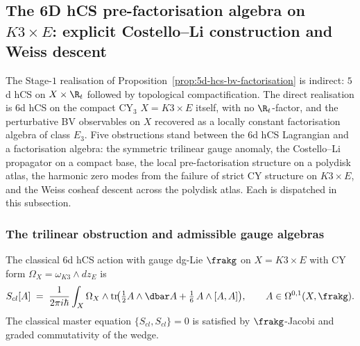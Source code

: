 \subsection{The 6D hCS pre-factorisation algebra on \texorpdfstring{$K3 \times E$}{K3 x E}: explicit Costello--Li construction and Weiss descent}
\label{subsec:6d-hcs-k3e-explicit-construction}

The Stage-$1$ realisation of Proposition~\ref{prop:5d-hcs-bv-factorisation} is
indirect: $5$d hCS on $X \times \R_t$ followed by topological compactification.
The direct realisation is $6$d hCS on the compact CY$_3$ $X = K3 \times E$
itself, with no $\R_t$-factor, and the perturbative BV observables on $X$
recovered as a locally constant factorisation algebra of class $E_3$.
Five obstructions stand between the $6$d hCS Lagrangian and a
factorisation algebra: the symmetric trilinear gauge anomaly, the
Costello--Li propagator on a compact base, the local pre-factorisation
structure on a polydisk atlas, the harmonic zero modes from the failure
of strict CY structure on $K3\times E$, and the Weiss cosheaf descent
across the polydisk atlas. Each is dispatched in this subsection.

\subsubsection{The trilinear obstruction and admissible gauge algebras}
\label{subsubsec:trilinear-obstruction-admissible-g}

The classical $6$d hCS action with gauge dg-Lie $\frakg$ on $X = K3 \times E$
with CY form $\Omega_X = \omega_{K3} \wedge dz_E$ is
\begin{equation}
\label{eq:6d-hcs-action-k3xe}
 S_{cl}[A] \;=\; \frac{1}{2\pi i \hbar} \int_X \Omega_X \wedge
 \operatorname{tr}\!\bigl(\tfrac{1}{2} A \wedge \dbar A + \tfrac{1}{6}\, A \wedge [A, A]\bigr),
\qquad A \in \Omega^{0, 1}(X, \frakg).
\end{equation}
The classical master equation $\{S_{cl}, S_{cl}\} = 0$ is satisfied by
$\frakg$-Jacobi and graded commutativity of the wedge.

